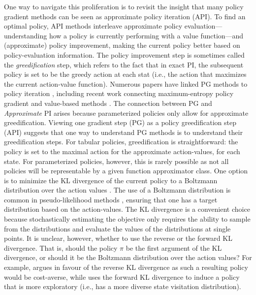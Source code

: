\documentclass[twoside,11pt]{article}
\begin{document}
One way to navigate this proliferation is to revisit the insight that many policy gradient methods can be seen as approximate policy iteration (API). To find an optimal policy, API methods \citep{bertsekas2011approximate,scherrer2014approximate} interleave approximate policy evaluation---understanding how a policy is currently performing with a value function---and (approximate) policy improvement, making the current policy better based on policy-evaluation information. 
The policy improvement step is sometimes called the \textit{greedification} step, which refers to the fact that in exact PI, the subsequent policy is set to be the greedy action at each stat (i.e., the action that maximizes the current action-value function).
Numerous papers have linked PG methods to policy iteration \citep{sutton2000policy,kakade2002approximately,perkins2002existence,perkins2003convergent,wagner2011reinterpretation,wagner2013optimistic,scherrer2014local,bhandari2019global}, including recent work connecting maximum-entropy policy gradient and value-based methods \citep{o2016combining,nachum2017bridging, schulman2017equivalence, nachum2019algaedice}.
The connection between PG and \emph{Approximate} PI arises because parameterized policies only allow for approximate greedification. Viewing one gradient step (PG) as a policy greedification step (API) suggests that one way to understand PG methods is to understand their greedification steps. For tabular policies, greedification is straightforward: the policy is set to the maximal action for the approximate action-values, for each state. 
For parameterized policies, however, this is rarely possible as not all policies will be representable by a given function approximator class. 
One option is to minimize the KL divergence of the current policy to a Boltzmann distribution over the action values \citep{wagner2011reinterpretation}. 
The use of a Boltzmann distribution is common in pseudo-likelihood methods \citep{kober2009policy,neumann2011variational,levine2018reinforcement}, ensuring that one has a target distribution based on the action-values. The KL divergence is a convenient choice because stochastically estimating the objective only requires the ability to sample from the distributions and evaluate the values of the distributions at single points. It is unclear, however, whether to use the reverse or the forward KL divergence. That is, should the policy $\pi$ be the first argument of the KL divergence, or should it be the Boltzmann distribution over the action values? For example, \citet{neumann2011variational} argues in favour of the reverse KL divergence as such a resulting policy would be cost-averse, while \citet{norouzi2016reward} uses the forward KL divergence to induce a policy that is more exploratory (i.e., has a more diverse state visitation distribution). 
\end{document}
